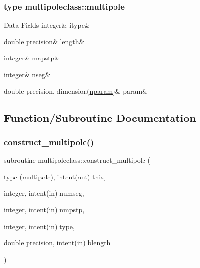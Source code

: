 \subsubsection{type multipoleclass\+::multipole}
\begin{DoxyFields}{Data Fields}
\mbox{\label{namespacemultipoleclass_a0819a9c738ccf5ddd0aa69c2a7befd2a}} 
integer&
itype&
\\
\hline

\mbox{\label{namespacemultipoleclass_aa096a41e77f2a963837b3ec8d5b3324b}} 
double precision&
length&
\\
\hline

\mbox{\label{namespacemultipoleclass_a4d8dd9ec28f1f2396c1fe8634b1ffb81}} 
integer&
mapstp&
\\
\hline

\mbox{\label{namespacemultipoleclass_a7e808e5433de77a1defc9a21691400dc}} 
integer&
nseg&
\\
\hline

\mbox{\label{namespacemultipoleclass_ab06c87e37bb85347c808f7e43bd9bd1f}} 
double precision, dimension(\mbox{\hyperlink{namespacemultipoleclass_a67bb1a71461cf39cdd365adab7fec8b9}{nparam}})&
param&
\\
\hline

\end{DoxyFields}


\subsection{Function/\+Subroutine Documentation}
\mbox{\label{namespacemultipoleclass_acce84c33b6ef25e4e2ee0572faa92b60}} 
\subsubsection{\texorpdfstring{construct\_multipole()}{construct\_multipole()}}
{\footnotesize\ttfamily subroutine multipoleclass\+::construct\+\_\+multipole (\begin{DoxyParamCaption}\item[{type (\mbox{\hyperlink{namespacemultipoleclass_structmultipoleclass_1_1multipole}{multipole}}), intent(out)}]{this,  }\item[{integer, intent(in)}]{numseg,  }\item[{integer, intent(in)}]{nmpstp,  }\item[{integer, intent(in)}]{type,  }\item[{double precision, intent(in)}]{blength }\end{DoxyParamCaption})}

